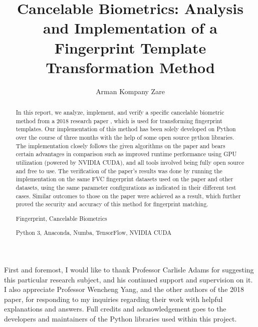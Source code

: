 \documentclass[fyp]{socreport}
\begin{document}
\title{Cancelable Biometrics: Analysis and Implementation of a Fingerprint Template Transformation Method}
\author{Arman Kompany Zare}
\maketitle
\begin{abstract}
In this report, we analyze, implement, and verify a specific cancelable biometric method from a 2018 research paper \cite{wencheng18cbio}, which is used for transforming fingerprint templates. Our implementation of this method has been solely developed on Python over the course of three months with the help of some open source python libraries. The implementation closely follows the given algorithms on the paper and bears certain advantages in comparison such as improved runtime performance using GPU utilization (powered by NVIDIA CUDA), and all tools involved being fully open source and free to use. The verification of the paper's results was done by running the implementation on the same FVC fingerprint datasets used on the paper and other datasets, using the same parameter configurations as indicated in their different test cases. Similar outcomes to those on the paper were achieved as a result, which further proved the security and accuracy of this method for fingerprint matching.

\begin{keywords}
	Fingerprint, Cancelable Biometrics
\end{keywords}
\begin{implement}
	Python 3, Anaconda, Numba, TensorFlow, NVIDIA CUDA 
\end{implement}
\end{abstract}

\begin{acknowledgement}
   First and foremost, I would like to thank Professor Carlisle Adams for suggesting this particular research subject, and his continued support and supervision on it. I also appreciate Professor Wencheng Yang, and the other authors of the 2018 paper, for responding to my inquiries regarding their work with helpful explanations and answers. Full credits and acknowledgement goes to the developers and maintainers of the Python libraries used within this project.
\end{acknowledgement}

\listoffigures
\listoftables
\tableofcontents 
\end{document}
